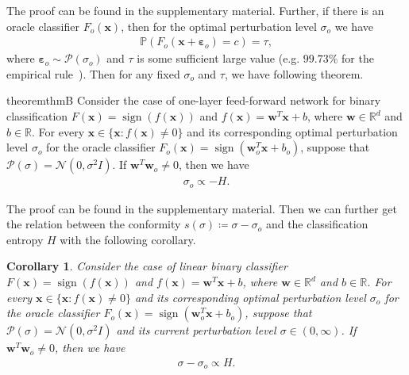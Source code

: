 \documentclass[letterpaper]{article} %
\newtheorem{corollary}{Corollary}[theorem]
\begin{document}
The proof can be found in the supplementary material. Further, if there is an oracle classifier $F_o(\mathbf{x})$, then for the optimal perturbation level $\sigma_o$ we have
\begin{align}
\mathbb{P}(F_o(\mathbf{x}+\boldsymbol{\varepsilon}_o) = c) = \tau,
\end{align}
where $\boldsymbol{\varepsilon}_o  \sim \mathcal{P}(\sigma_o)$ and $\tau$ is some sufficient large value (e.g. $99.73\%$ for the empirical rule~\cite{pukelsheim1994three}). Then for any fixed $\sigma_o$ and $\tau$, we have following theorem.

\begin{restatable}[]{theorem}{thmB}
	\label{theorem:thmB}
	Consider the case of one-layer feed-forward network for binary classification $F(\mathbf{x}) = \operatorname{sign}(f(\mathbf{x}))$ and $f(\mathbf{x}) = \mathbf{w}^T \mathbf{x} + b$, where $\mathbf{w} \in \mathbb{R}^d$ and $b \in \mathbb{R}$.
	For every $\mathbf{x} \in \{\mathbf{x}: f(\mathbf{x}) \neq 0\}$ and its corresponding optimal perturbation level $\sigma_o$ for the oracle classifier $F_o(\mathbf{x})=\operatorname{sign}(\mathbf{w}_o^T\mathbf{x}+b_o)$, suppose that $\mathcal{P}(\sigma) = \mathcal{N}(0, \sigma^{2} I)$. If $\mathbf{w}^T \mathbf{w}_o \neq 0$, then we have
	\begin{align}
	\sigma_o \propto -H.
	\end{align}
\end{restatable}
The proof can be found in the supplementary material. Then we can further get the relation between the conformity $s(\sigma) \coloneqq \sigma-\sigma_o$ and the classification entropy $H$ with the following corollary.

\begin{corollary}
	\label{corollary:cor1}
	Consider the case of linear binary classifier $F(\mathbf{x}) = \operatorname{sign}(f(\mathbf{x}))$ and $f(\mathbf{x}) = \mathbf{w}^T \mathbf{x} + b$, where $\mathbf{w} \in \mathbb{R}^d$ and $b \in \mathbb{R}$.
	For every $\mathbf{x} \in \{\mathbf{x}: f(\mathbf{x}) \neq 0\}$ and its corresponding optimal perturbation level $\sigma_o$ for the oracle classifier $F_o(\mathbf{x})=\operatorname{sign}(\mathbf{w}_o^T\mathbf{x}+b_o)$, suppose that $\mathcal{P}(\sigma) = \mathcal{N}(0, \sigma^{2} I)$ and its current perturbation level $\sigma \in (0, \infty)$. If $\mathbf{w}^T \mathbf{w}_o \neq 0$, then we have
	\begin{align}
	\sigma - \sigma_o \propto H.
	\end{align}
\end{corollary}
\end{document}
